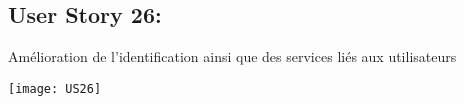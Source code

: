 \newpage{}
\subsection{User Story 26:}
Amélioration  de l'identification ainsi que des services liés aux utilisateurs


  \begin{center}
        \texttt{[image: US26]}
  \end{center}

